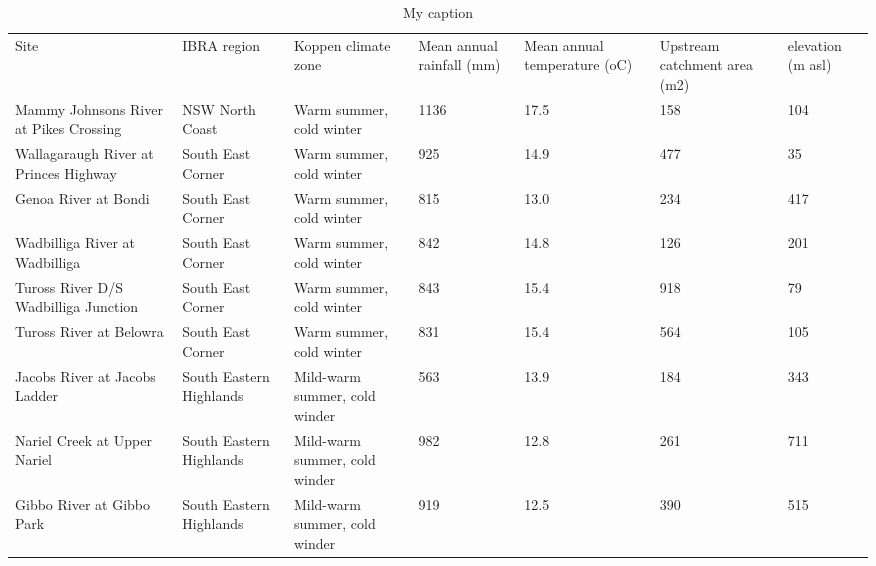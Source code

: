 \begin{table}[]
\centering
\caption{My caption}
\label{my-label}
\begin{tabular}{lllllll}
Site                                   & IBRA region              & Koppen climate zone           & Mean annual rainfall (mm) & Mean annual temperature (oC) & Upstream catchment area (m2) & elevation (m asl) \\
Mammy Johnsons River at Pikes Crossing & NSW North Coast          & Warm summer, cold winter      & 1136                      & 17.5                         & 158                          & 104               \\
Wallagaraugh River at Princes Highway  & South East Corner        & Warm summer, cold winter      & 925                       & 14.9                         & 477                          & 35                \\
Genoa River at Bondi                   & South East Corner        & Warm summer, cold winter      & 815                       & 13.0                         & 234                          & 417               \\
Wadbilliga River at Wadbilliga         & South East Corner        & Warm summer, cold winter      & 842                       & 14.8                         & 126                          & 201               \\
Tuross River D/S Wadbilliga Junction   & South East Corner        & Warm summer, cold winter      & 843                       & 15.4                         & 918                          & 79                \\
Tuross River at Belowra                & South East Corner        & Warm summer, cold winter      & 831                       & 15.4                         & 564                          & 105               \\
Jacobs River at Jacobs Ladder          & South Eastern Highlands  & Mild-warm summer, cold winder & 563                       & 13.9                         & 184                          & 343               \\
Nariel Creek at Upper Nariel           & South Eastern Highlands  & Mild-warm summer, cold winder & 982                       & 12.8                         & 261                          & 711               \\
Gibbo River at Gibbo Park              & South Eastern Highlands  & Mild-warm summer, cold winder & 919                       & 12.5                         & 390                          & 515               \\

\end{tabular}
\end{table}
